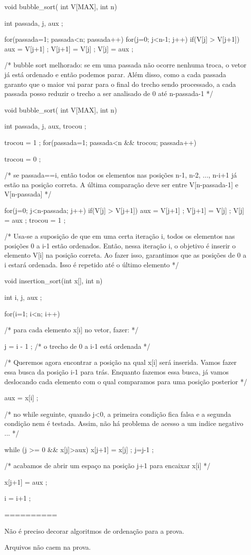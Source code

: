 void bubble_sort( int V[MAX], int n)
{
  int passada, j, aux ;

  for(passada=1; passada<n; passada++)
    for(j=0; j<n-1; j++)
      if(V[j] > V[j+1]) {
        aux = V[j+1] ;
        V[j+1] = V[j] ;
        V[j] = aux ;
      }
}

/* bubble sort melhorado: se em uma passada não
   ocorre nenhuma troca, o vetor já está ordenado
   e então podemos parar.
   Além disso, como a cada passada garanto que
   o maior vai parar para o final do trecho sendo
   processado, a cada passada posso reduzir o
   trecho a ser analisado de 0 até n-passada-1 */
   
void bubble_sort( int V[MAX], int n)
{
  int passada, j, aux, trocou ;

  trocou = 1 ;
  for(passada=1; passada<n && trocou; passada++) {
  
    trocou = 0 ;
    
    /* se passada==i, então todos os elementos
       nas posições n-1, n-2, ..., n-i+1 já estão
       na posição correta. A última comparação
       deve ser entre V[n-passada-1] e V[n-passada] */
       
    for(j=0; j<n-passada; j++) {                                         
      if(V[j] > V[j+1]) {
        aux = V[j+1] ;
        V[j+1] = V[j] ;
        V[j] = aux ;
        trocou = 1 ;
      }
    }
    
  } 
}

/* Usa-se a suposição de que em uma certa iteração
   i, todos os elementos nas posições 0 a i-1
   estão ordenados. Então, nessa iteração i, o objetivo
   é inserir o elemento V[i] na posição correta.
   Ao fazer isso, garantimos que as posições de
   0 a i estará ordenada. Isso é repetido até o
   último elemento */
   
void insertion_sort(int x[], int n) {
  int i, j, aux ;

  for(i=1; i<n; i++) {

    /* para cada elemento x[i] no vetor, fazer: */
    
    j = i - 1 ; /* o trecho de 0 a i-1 está ordenada */

    /* Queremos agora encontrar a posição na qual
       x[i] será inserida. Vamos fazer essa busca
       da posição i-1 para trás. Enquanto fazemos essa
       busca, já vamos deslocando cada elemento
       com o qual comparamos para uma posição posterior */

    aux = x[i] ;
    
    /* no while seguinte, quando j<0, a primeira
       condição fica falsa e a segunda condição nem
       é testada. Assim, não há problema de acesso
       a um indice negativo ... */

    while (j >= 0 && x[j]>aux) {
      x[j+1] = x[j] ;
      j=j-1 ;
    }

    /* acabamos de abrir um espaço na posição j+1
       para encaixar x[i] */
       
    x[j+1] = aux ;

    i = i+1 ;
  }
}


==========

Não é preciso decorar algoritmos de ordenação
para a prova.

Arquivos não caem na prova.

